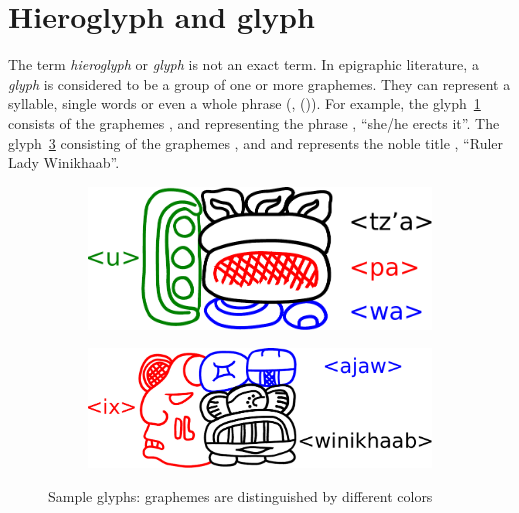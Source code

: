 \documentclass[../main.tex]{subfiles}
\begin{document}
\section{Hieroglyph and glyph}
The term \emph{hieroglyph} or \emph{glyph} is not an exact term.
In epigraphic literature, a \emph{glyph} is considered to be a group of one or more graphemes.
They can represent a syllable, single words or even a whole phrase 
(\cite[1]{bricker1986}, (\cite[23]{macrilooper2003})).
For example, the glyph~\ref{fig:terminology-glyphs-utzapaw} consists of the 
graphemes ,  and  representing the phrase
, ``she/he erects it''.
The glyph~\ref{fig:terminology-glyphs-ixwinikhaabajaw} consisting of the 
graphemes ,  and 
and represents the noble title , ``Ruler Lady Winikhaab''.
\begin{figure}
    \centering
    \begin{subfigure}[b]{0.49\textwidth}
        \centering
        \includegraphics[height=\glyphblockheight]{img/glyphs-utzapaw}
        \caption{}
        \label{fig:terminology-glyphs-utzapaw}
    \end{subfigure}
    \hfill
    \begin{subfigure}[b]{0.49\textwidth}
        \centering
        \includegraphics[height=\glyphblockheight]{img/glyphs-ixwinikhaabajaw}
        \caption{}
        \label{fig:terminology-glyphs-ixwinikhaabajaw}
    \end{subfigure}
    \caption{Sample glyphs: graphemes are distinguished by different colors}
\end{figure}
\end{document}
